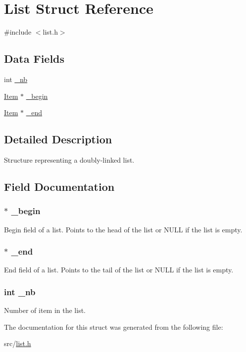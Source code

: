 \hypertarget{struct_list}{\section{List Struct Reference}
\label{struct_list}
}


{\ttfamily \#include $<$list.\-h$>$}

\subsection*{Data Fields}
\begin{DoxyCompactItemize}
\item 
int \hyperlink{struct_list_a8da1dd9f9175a0c163a1c985219e935d}{\-\_\-nb}
\item 
\hyperlink{list_8h_a35821ac6752fdc00299cd3f078891db1}{Item} $\ast$ \hyperlink{struct_list_aadc68da03e13bb77e1bdbc4481cdfa8e}{\-\_\-begin}
\item 
\hyperlink{list_8h_a35821ac6752fdc00299cd3f078891db1}{Item} $\ast$ \hyperlink{struct_list_a679253b792f327d2f08aaa1bdaf639ae}{\-\_\-end}
\end{DoxyCompactItemize}


\subsection{Detailed Description}
Structure representing a doubly-\/linked list. 

\subsection{Field Documentation}
\hypertarget{struct_list_aadc68da03e13bb77e1bdbc4481cdfa8e}{
\subsubsection[{\-\_\-begin}]{$\ast$ {\bf \-\_\-begin}}}\label{struct_list_aadc68da03e13bb77e1bdbc4481cdfa8e}
Begin field of a list. Points to the head of the list or N\-U\-L\-L if the list is empty. \hypertarget{struct_list_a679253b792f327d2f08aaa1bdaf639ae}{
\subsubsection[{\-\_\-end}]{$\ast$ {\bf \-\_\-end}}}\label{struct_list_a679253b792f327d2f08aaa1bdaf639ae}
End field of a list. Points to the tail of the list or N\-U\-L\-L if the list is empty. \hypertarget{struct_list_a8da1dd9f9175a0c163a1c985219e935d}{
\subsubsection[{\-\_\-nb}]{\setlength{\rightskip}{0pt plus 5cm}int {\bf \-\_\-nb}}}\label{struct_list_a8da1dd9f9175a0c163a1c985219e935d}
Number of item in the list. 

The documentation for this struct was generated from the following file\-:\begin{DoxyCompactItemize}
\item 
src/\hyperlink{list_8h}{list.\-h}\end{DoxyCompactItemize}

